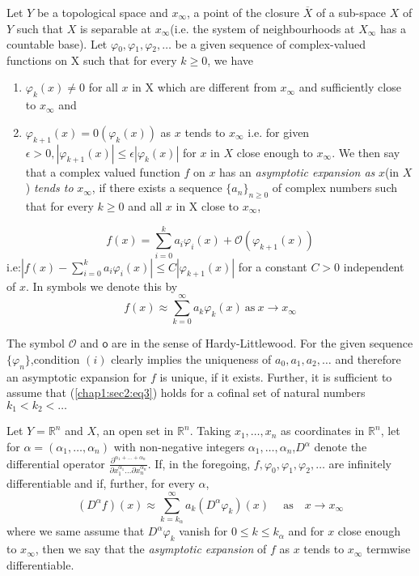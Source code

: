 Let $Y$ be a topological space and $x_{\infty}$, a point of the closure
$\overline{X}$ of a sub-space $X$ of $Y$ such that $X$ is separable at
$x{_\infty}$(i.e. the system of neighbourhoods at $X{_\infty}$ has a
countable base). Let $\varphi{_0}, \varphi{_1},\varphi{_2},\ldots$ be a
given sequence of complex-valued functions on X such that for every
$k\ge0$, we have 
\begin{enumerate}
\renewcommand{\theenumi}{\roman{enumi}}
\renewcommand{\labelenumi}{(\theenumi)}
\item $\varphi_{k}(x) \neq 0$ for all $x$ in X which are different
  from $x{_{\infty}}$ and sufficiently close to $x{_{\infty}}$ and 
\item $\varphi_{k+1}(x)= 0(\varphi_{k}(x))$ as $x$ tends to
  $x_{\infty}$ i.e. for given $\epsilon > 0,
  |\varphi_{k+1}(x)|\le\epsilon|\varphi_{k}(x)|$ for $x$ in $X$ close
  enough to $x_{\infty}$. We then say that a complex valued function
  $f$ on $x$ has an {\em asymptotic expansion as} $x$(in $X$) {\em tends
    to} $x_{\infty}$, if there exists a sequence $\{a_{n}\}_{n\ge0}$ of
  complex numbers such that for every $k\ge0$ and all $x$ in X close
  to $x_{\infty}$,
\end{enumerate}
\begin{equation*}
  f(x)=\sum_{i=0}^{k}a_{i}\varphi_{i}(x)+\mathcal{O}(\varphi_{k+1}(x))
  \tag{3}\label{chap1:sec2:eq3}   
\end{equation*}
i.e:\pageoriginale $|f(x)-\sum_{i=0}^{k}a_{i}\varphi_{i}(x)|\le C|\varphi_{k+1}(x)|$
for a constant $C>0$ independent of $x$. In symbols we denote this by 
\begin{equation*}
  f(x)\approx\sum_{k=0}^{\infty}a_k\varphi_k(x)~\text{as}~ x\rightarrow
  x_{\infty}\tag{4}\label{chap1:sec2:eq4}
\end{equation*}

The symbol $\mathcal{O}$ and $\mathsf{o}$ are in the sense of Hardy-Littlewood.
For the given sequence $\{\varphi_{n}\}$,condition $(i)$ clearly
implies the uniqueness of $a_{0},a_{1},a_{2},\ldots$ and therefore an
asymptotic expansion for $f$ is unique, if it exists. Further, it is
sufficient to assume that (\ref{chap1:sec2:eq3}) holds for a cofinal
set of natural numbers $k_{1}<k_{2}<\ldots$ 

Let $Y=\mathbb{R}^{n}$ and $X$, an open set in $\mathbb{R}^{n}$.
Taking $x_{1},\ldots,x_{n}$ as coordinates in $\mathbb{R}^{n}$, let
for $\alpha=(\alpha_{1},\ldots,\alpha_{n})$ with non-negative integers
$\alpha_{1},\ldots,\alpha_{n}$,$D^{\alpha}$ denote the differential
operator $\frac{\partial^{\alpha{_1}+\ldots+\alpha_{n}}}{\partial
  x_{1}^{\alpha_{1}}\ldots\partial x_{n}^{\alpha_{n}}}$. If, in the
foregoing, $f,\varphi_{0},\varphi_{1}, \varphi_{2},\ldots$ are
infinitely differentiable and if, further, for every $\alpha$,
\begin{equation*}
  (D^{\alpha}f)(x)\approx\sum_{k=k_{\alpha}}^{\infty}a_{k}(D^{\alpha}\varphi_{k})(x)\quad
  ~\text{as}\quad x\rightarrow x_{\infty}
\end{equation*}
where we same assume that $D^{\alpha}\varphi_{k}$ vanish for $0\le
k\le k_{\alpha}$ and for $x$ close enough to $x_{\infty}$, then we say
that the {\em asymptotic expansion} of $f$ as $x$ tends to
$x_{\infty}$ termwise differentiable.

